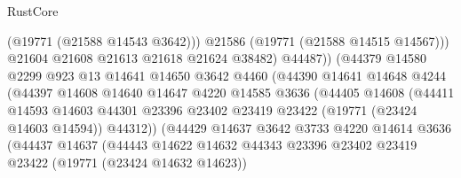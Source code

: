 \begin{lexlean}{RustCore}
\begin{coremodule}
                                      (@19771 (@21588 @14543 @3642)))
                                    @21586
                                    (@19771 (@21588 @14515 @14567)))
                                  @21604
                                  @21608
                                  @21613
                                  @21618
                                  @21624
                                  @38482)
                                @44487))
                            (@44379
                              @14580
                              @2299
                              @923
                              @13
                              @14641
                              @14650
                              @3642
                              @4460
                              (@44390
                                @14641
                                @14648
                                @4244
                                (@44397
                                  @14608
                                  @14640
                                  @14647
                                  @4220
                                  @14585
                                  @3636
                                  (@44405
                                    @14608
                                    (@44411
                                      @14593
                                      @14603
                                      @44301
                                      @23396
                                      @23402
                                      @23419
                                      @23422
                                      (@19771 (@23424 @14603 @14594))
                                      @44312))
                                  (@44429
                                    @14637
                                    @3642
                                    @3733
                                    @4220
                                    @14614
                                    @3636
                                    (@44437
                                      @14637
                                      (@44443
                                        @14622
                                        @14632
                                        @44343
                                        @23396
                                        @23402
                                        @23419
                                        @23422
                                        (@19771 (@23424 @14632 @14623))

\end{coremodule}
\end{lexlean}
